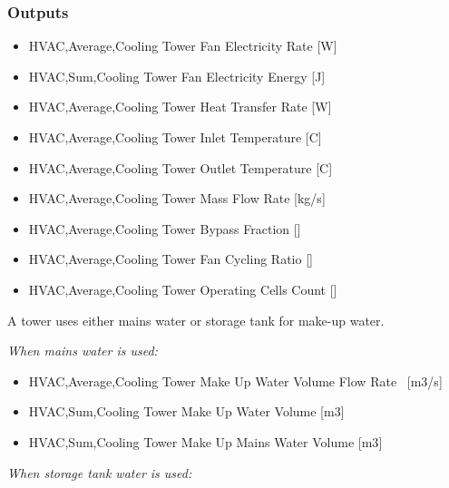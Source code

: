 \subsubsection{Outputs}\label{outputs-004}

\begin{itemize}
\item
  HVAC,Average,Cooling Tower Fan Electricity Rate {[}W{]}
\item
  HVAC,Sum,Cooling Tower Fan Electricity Energy {[}J{]}
\item
  HVAC,Average,Cooling Tower Heat Transfer Rate {[}W{]}
\item
  HVAC,Average,Cooling Tower Inlet Temperature {[}C{]}
\item
  HVAC,Average,Cooling Tower Outlet Temperature {[}C{]}
\item
  HVAC,Average,Cooling Tower Mass Flow Rate {[}kg/s{]}
\item
  HVAC,Average,Cooling Tower Bypass Fraction {[]}
\item
  HVAC,Average,Cooling Tower Fan Cycling Ratio {[]}
\item
  HVAC,Average,Cooling Tower Operating Cells Count {[]}
\end{itemize}

A tower uses either mains water or storage tank for make-up water.

\emph{When mains water is used:}

\begin{itemize}
\item
  HVAC,Average,Cooling Tower Make Up Water Volume Flow Rate~ {[}m3/s{]}
\item
  HVAC,Sum,Cooling Tower Make Up Water Volume {[}m3{]}
\item
  HVAC,Sum,Cooling Tower Make Up Mains Water Volume {[}m3{]}
\end{itemize}

\emph{When storage tank water is used:}

